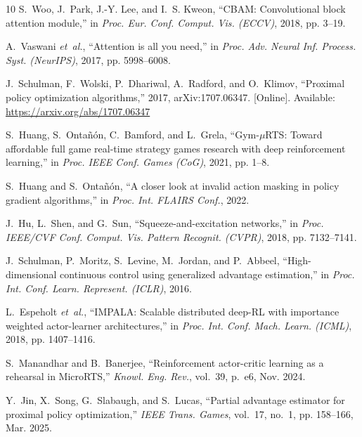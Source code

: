 \documentclass[conference]{IEEEtran}
\begin{document}
\begin{thebibliography}{10}
S.~Woo, J.~Park, J.-Y. Lee, and I.~S. Kweon, ``{CBAM}: Convolutional block
  attention module,'' in \emph{Proc. Eur. Conf. Comput. Vis. ({ECCV})}, 2018,
  pp. 3--19.

A.~Vaswani \emph{et~al.}, ``Attention is all you need,'' in \emph{Proc. Adv.
  Neural Inf. Process. Syst. ({NeurIPS})}, 2017, pp. 5998--6008.

\BIBentryALTinterwordspacing
J.~Schulman, F.~Wolski, P.~Dhariwal, A.~Radford, and O.~Klimov, ``Proximal
  policy optimization algorithms,'' 2017, arXiv:1707.06347. [Online].
  Available: \url{https://arxiv.org/abs/1707.06347}
\BIBentrySTDinterwordspacing

S.~Huang, S.~Onta{\~n}{\'o}n, C.~Bamford, and L.~Grela, ``Gym-{$\mu$RTS}:
  Toward affordable full game real-time strategy games research with deep
  reinforcement learning,'' in \emph{Proc. {IEEE} Conf. Games ({CoG})}, 2021,
  pp. 1--8.

S.~Huang and S.~Onta{\~n}{\'o}n, ``A closer look at invalid action masking in
  policy gradient algorithms,'' in \emph{Proc. Int. {FLAIRS} Conf.}, 2022.

J.~Hu, L.~Shen, and G.~Sun, ``Squeeze-and-excitation networks,'' in \emph{Proc.
  {IEEE/CVF} Conf. Comput. Vis. Pattern Recognit. ({CVPR})}, 2018, pp.
  7132--7141.

J.~Schulman, P.~Moritz, S.~Levine, M.~Jordan, and P.~Abbeel, ``High-dimensional
  continuous control using generalized advantage estimation,'' in \emph{Proc.
  Int. Conf. Learn. Represent. ({ICLR})}, 2016.

L.~Espeholt \emph{et~al.}, ``{IMPALA}: Scalable distributed deep-{RL} with
  importance weighted actor-learner architectures,'' in \emph{Proc. Int. Conf.
  Mach. Learn. ({ICML})}, 2018, pp. 1407--1416.

S.~Manandhar and B.~Banerjee, ``Reinforcement actor-critic learning as a
  rehearsal in {MicroRTS},'' \emph{Knowl. Eng. Rev.}, vol.~39, p.~e6, Nov.
  2024.

Y.~Jin, X.~Song, G.~Slabaugh, and S.~Lucas, ``Partial advantage estimator for
  proximal policy optimization,'' \emph{{IEEE} Trans. Games}, vol.~17, no.~1,
  pp. 158--166, Mar. 2025.


\end{thebibliography}
\end{document}
